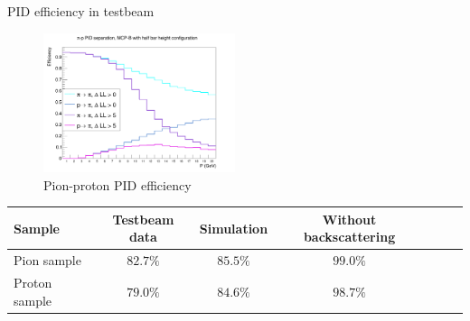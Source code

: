 \documentclass{beamer}
\begin{document}
\begin{frame}{PID efficiency in testbeam}
  \begin{figure}
    \centering
    \includegraphics[width = 0.5\textwidth]{Plots/PionProtonPIDEfficiencyMCPB_Backscattering.png}
    \caption{Pion-proton PID efficiency}
  \end{figure}
  \begin{center}
    \begin{tabular}{lcccccc} 
      \hline
      Sample        & Testbeam data & Simulation & Without backscattering \\
      \hline
      Pion sample   & $82.7\%$      & $85.5\%$   & $99.0\%$ \\
      Proton sample & $79.0\%$      & $84.6\%$   & $98.7\%$ \\
      \hline
    \end{tabular}
  \end{center}
\end{frame}
\end{document}
